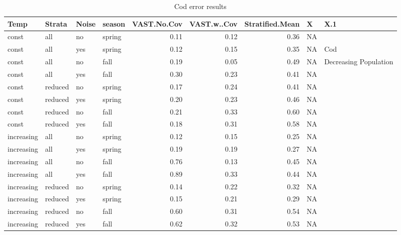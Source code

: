 \documentclass[
]{article}
\begin{document}
\begin{table}

\caption{\label{tab:unnamed-chunk-1}Cod error results}
\centering
\begin{tabular}[t]{l|l|l|l|r|r|r|l|l}
\hline
Temp & Strata & Noise & season & VAST.No.Cov & VAST.w..Cov & Stratified.Mean & X & X.1\\
\hline
const & all & no & spring & 0.11 & 0.12 & 0.36 & NA & \\
\hline
const & all & yes & spring & 0.12 & 0.15 & 0.35 & NA & Cod\\
\hline
const & all & no & fall & 0.19 & 0.05 & 0.49 & NA & Decreasing Population\\
\hline
const & all & yes & fall & 0.30 & 0.23 & 0.41 & NA & \\
\hline
const & reduced & no & spring & 0.17 & 0.24 & 0.41 & NA & \\
\hline
const & reduced & yes & spring & 0.20 & 0.23 & 0.46 & NA & \\
\hline
const & reduced & no & fall & 0.21 & 0.33 & 0.60 & NA & \\
\hline
const & reduced & yes & fall & 0.18 & 0.31 & 0.58 & NA & \\
\hline
increasing & all & no & spring & 0.12 & 0.15 & 0.25 & NA & \\
\hline
increasing & all & yes & spring & 0.19 & 0.19 & 0.27 & NA & \\
\hline
increasing & all & no & fall & 0.76 & 0.13 & 0.45 & NA & \\
\hline
increasing & all & yes & fall & 0.89 & 0.33 & 0.44 & NA & \\
\hline
increasing & reduced & no & spring & 0.14 & 0.22 & 0.32 & NA & \\
\hline
increasing & reduced & yes & spring & 0.15 & 0.21 & 0.29 & NA & \\
\hline
increasing & reduced & no & fall & 0.60 & 0.31 & 0.54 & NA & \\
\hline
increasing & reduced & yes & fall & 0.62 & 0.32 & 0.53 & NA & \\
\hline
\end{tabular}
\end{table}
\end{document}
